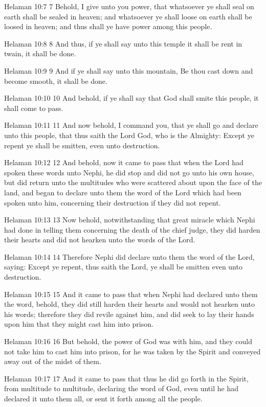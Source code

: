 Helaman 10:7
 7 Behold, I give unto you power, that whatsoever ye shall seal
on earth shall be sealed in heaven; and whatsoever ye shall loose
on earth shall be loosed in heaven; and thus shall ye have power
among this people.

Helaman 10:8
 8 And thus, if ye shall say unto this temple it shall be rent in
twain, it shall be done.

Helaman 10:9
 9 And if ye shall say unto this mountain, Be thou cast down and
become smooth, it shall be done.

Helaman 10:10
 10 And behold, if ye shall say that God shall smite this people,
it shall come to pass.

Helaman 10:11
 11 And now behold, I command you, that ye shall go and declare
unto this people, that thus saith the Lord God, who is the
Almighty: Except ye repent ye shall be smitten, even unto
destruction.

Helaman 10:12
 12 And behold, now it came to pass that when the Lord had spoken
these words unto Nephi, he did stop and did not go unto his own
house, but did return unto the multitudes who were scattered
about upon the face of the land, and began to declare unto them
the word of the Lord which had been spoken unto him, concerning
their destruction if they did not repent.

Helaman 10:13
 13 Now behold, notwithstanding that great miracle which Nephi
had done in telling them concerning the death of the chief judge,
they did harden their hearts and did not hearken unto the words
of the Lord.

Helaman 10:14
 14 Therefore Nephi did declare unto them the word of the Lord,
saying: Except ye repent, thus saith the Lord, ye shall be
smitten even unto destruction.

Helaman 10:15
 15 And it came to pass that when Nephi had declared unto them
the word, behold, they did still harden their hearts and would
not hearken unto his words; therefore they did revile against
him, and did seek to lay their hands upon him that they might
cast him into prison.

Helaman 10:16
 16 But behold, the power of God was with him, and they could not
take him to cast him into prison, for he was taken by the Spirit
and conveyed away out of the midst of them.

Helaman 10:17
 17 And it came to pass that thus he did go forth in the Spirit,
from multitude to multitude, declaring the word of God, even
until he had declared it unto them all, or sent it forth among
all the people.

